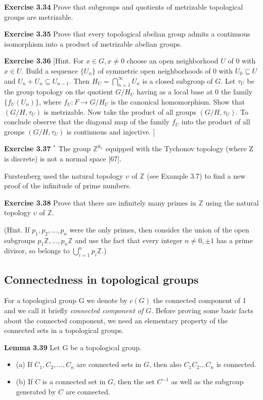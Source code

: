 \documentclass[12pt]{article}
\begin{document}
    \textbf{Exercise 3.34} Prove that subgroups and quotients of metrizable topological groups are metrizable.
    

    \textbf{Exercise 3.35} Prove that every topological abelian group admits a continuous isomorphism into a product of
    metrizable abelian groups.
    

    \textbf{Exercise 3.36} [Hint. For $x \in G, x \neq 0$ choose an open neighborhood $U$ of $0$ with $x \in U$. Build a sequence $\{U_n\}$ of
    symmetric open neighborhoods of 0 with $U_0 \subseteq U$ and $U_n + U_n \subseteq U_{n-1}$. Then $H_U = \bigcap^{\infty}_{n=1} U_n$ is a closed
    subgroup of $G$. Let $\tau_U$ be the group topology on the quotient $G/H_U$ having as a local base at 0 the family
    $\{f_U (U_n)\}$, where $f_U : F \to G/H_U$ is the canonical homomorphism. Show that $(G/H, \tau_U)$ is metrizable. Now
    take the product of all groups $(G/H, \tau_U )$. To conclude observe that the diagonal map of the family $f_U$ into the
    product of all groups $(G/H, \tau_U )$ is continuous and injective. ]
    
    
    \textbf{Exercise 3.37} $^*$ The group $\mathbb{Z}^{\aleph_1}$ equipped with the Tychonov topology (where Z is discrete) is not a normal
    space [67].


        Furstenberg used the natural topology $\upsilon $ of $\mathbb{Z}$ (see Example 3.7) to find a new proof of the infinitude of prime
    numbers.


    \textbf{Exercise 3.38} Prove that there are infinitely many primes in $\mathbb{Z}$ using the natural topology $\upsilon$ of $\mathbb{Z}$.


        (Hint. If $p_1, p_2, . . . , p_n$ were the only primes, then consider the union of the open subgroups $p_1 \mathbb{Z}, . . . , p_n \mathbb{Z}$
    and use the fact that every integer $n \neq 0, \pm 1$ has a prime divisor, so belongs to $\bigcup^n_{i=1} p_i \mathbb{Z}$.)


    \subsection{Connectedness in topological groups}
    For a topological group G we denote by $c(G)$ the connected component of 1 and we call it briefly \emph{connected
    component of $G$}.
        Before proving some basic facts about the connected component, we need an elementary property of the
    connected sets in a topological groups.


    \textbf{Lemma 3.39} Let G be a topological group.
    \begin{itemize}

        \item (a) If $C_1, C_2, . . . , C_n$ are connected sets in $G$, then also $C_1 C_2 . . . C_n$ is connected.

        \item (b) If $C$ is a connected set in $G$, then the set $C^{-1}$ as well as the subgroup generated by $C$ are connected.
    
    \end{itemize}
\end{document}
